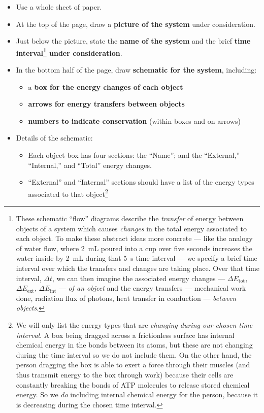 \documentclass[12pt]{article}
\begin{document}
	\begin{itemize}
	\item Use a whole sheet of paper.
	\item At the top of the page, draw a {\bf picture of the system} under consideration.
	\item Just below the picture, state the {\bf name of the system} and the brief {\bf time interval\footnote{These schematic ``flow'' diagrams describe the {\em transfer} of energy between objects of a system which causes {\em changes} in the total energy associated to each object. To make these abstract ideas more concrete --- like the analogy of water flow, where 2~mL poured into a cup over five seconds increases the water inside by 2~mL during that 5~s time interval  --- we specify a brief time interval over which the transfers and changes are taking place. Over that time interval, $\Delta t$, we can then imagine the associated energy changes  --- $\Delta E_\text{tot}$, $\Delta E_\text{ext}$, $\Delta E_\text{int}$ --- {\em of an object} and the energy transfers --- mechanical work done, radiation flux of photons, heat transfer in conduction --- {\em between objects}.} under consideration}.
	\item In the bottom half of the page, draw {\bf schematic for the system}, including:
		\begin{itemize}
		\item a {\bf box for the energy changes of each object}
		\item  {\bf arrows for energy transfers between objects}
		\item {\bf numbers to indicate conservation} (within boxes and on arrows)
		\end{itemize}
	\item Details of the schematic:
		\begin{itemize}
		\item Each object box has four sections: the ``Name''; and the ``External,'' ``Internal,'' and ``Total'' energy changes.
		\item ``External'' and ``Internal'' sections should have a list of the energy types associated to that object\footnote{We will only list the energy types that are {\em changing during our chosen time interval}.  A box being dragged across a frictionless surface has internal chemical energy in the bonds between its atoms, but these are not changing during the time interval so we do not include them. On the other hand, the person dragging the box is able to exert a force through their muscles (and thus transmit energy to the box through work) because their cells are constantly breaking the bonds of ATP molecules to release stored chemical energy.  So we {\em do} including internal chemical energy for the person, because it is decreasing during the chosen time interval. }

\end{itemize}
\end{itemize}
\end{document}
